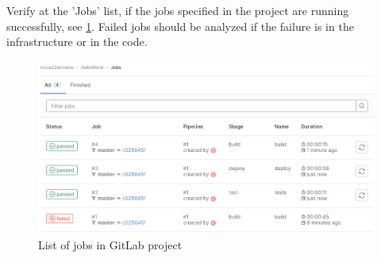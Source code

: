 Verify at the 'Jobs' list, if the jobs specified in the project are running successfully, see \ref{fig:gitlab_jobs_list}.
Failed jobs should be analyzed if the failure is in the infrastructure or in the code.
\begin{figure}[H]
	\centering
	\includegraphics[width=14cm]{images/gitlab_jobs_list.png}
	\caption{List of jobs in GitLab project}
	\label{fig:gitlab_jobs_list}
\end{figure}